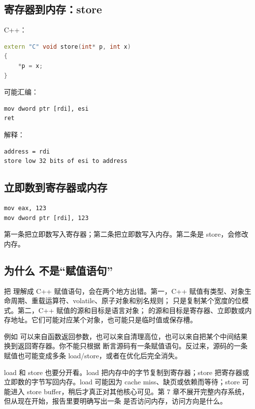 \subsection{寄存器到内存：store}

C++：

\begin{lstlisting}[language=C++]
extern "C" void store(int* p, int x)
{
    *p = x;
}
\end{lstlisting}

可能汇编：

\begin{lstlisting}
mov dword ptr [rdi], esi
ret
\end{lstlisting}

解释：

\begin{lstlisting}
address = rdi
store low 32 bits of esi to address
\end{lstlisting}

\subsection{立即数到寄存器或内存}

\begin{lstlisting}
mov eax, 123
mov dword ptr [rdi], 123
\end{lstlisting}

第一条把立即数写入寄存器；第二条把立即数写入内存。第二条是 store，会修改内存。

\subsection{为什么  不是“赋值语句”}

把  理解成 C++ 赋值语句，会在两个地方出错。第一，C++ 赋值有类型、对象生命周期、重载运算符、volatile、原子对象和别名规则； 只是复制某个宽度的位模式。第二，C++ 赋值的源和目标是语言对象； 的源和目标是寄存器、立即数或内存地址。它们可能对应某个对象，也可能只是临时值或保存槽。

例如  可以来自函数返回参数，也可以来自清理高位，也可以来自把某个中间结果换到返回寄存器。你不能只根据  断言源码有一条赋值语句。反过来，源码的一条赋值也可能变成多条 load/store，或者在优化后完全消失。

load 和 store 也要分开看。load 把内存中的字节复制到寄存器；store 把寄存器或立即数的字节写回内存。load 可能因为 cache miss、缺页或依赖而等待；store 可能进入 store buffer，稍后才真正对其他核心可见。第 7 章不展开完整内存系统，但从现在开始，报告里要明确写出一条  是否访问内存，访问方向是什么。

